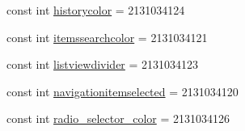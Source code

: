 \begin{DoxyCompactItemize}
const int \hyperlink{class_field_service_1_1_android_1_1_resource_1_1_color_a843f9e0fcf876add55fe0719880d7abf}{historycolor} = 2131034124
\item 
const int \hyperlink{class_field_service_1_1_android_1_1_resource_1_1_color_a61b278ecefa50c0cc17b878595397922}{itemssearchcolor} = 2131034121
\item 
const int \hyperlink{class_field_service_1_1_android_1_1_resource_1_1_color_add050ccd802ac8f8f333563a277cf2a3}{listviewdivider} = 2131034123
\item 
const int \hyperlink{class_field_service_1_1_android_1_1_resource_1_1_color_ad011e38d05d2e12f4ecfa158d32c2a37}{navigationitemselected} = 2131034120
\item 
const int \hyperlink{class_field_service_1_1_android_1_1_resource_1_1_color_a9340996216c145b0f25bf7fd5e609fe0}{radio\+\_\+selector\+\_\+color} = 2131034126
\end{DoxyCompactItemize}


